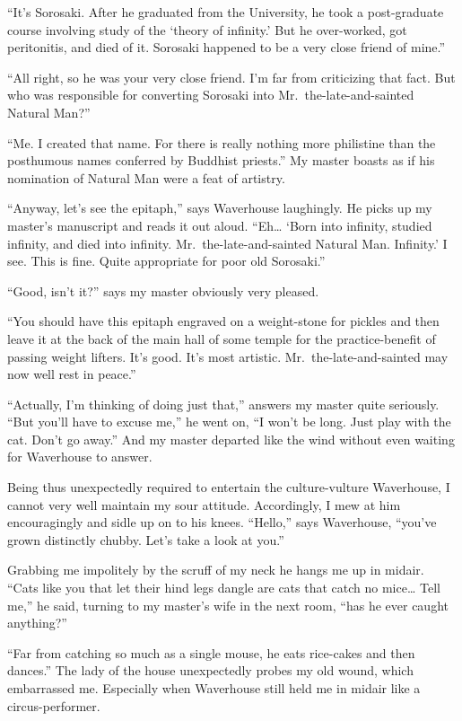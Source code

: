 \documentclass{book}
\begin{document}
``It's Sorosaki. After he graduated from the University, he took a
post-graduate course involving study of the `theory of infinity.' But he
over-worked, got peritonitis, and died of it. Sorosaki happened to be a
very close friend of mine.''

``All right, so he was your very close friend. I'm far from criticizing
that fact. But who was responsible for converting Sorosaki into
Mr.~the-late-and-sainted Natural Man?''

``Me. I created that name. For there is really nothing more philistine
than the posthumous names conferred by Buddhist priests.'' My master
boasts as if his nomination of Natural Man were a feat of artistry.

``Anyway, let's see the epitaph,'' says Waverhouse laughingly. He picks
up my master's manuscript and reads it out aloud. ``Eh\ldots{} `Born
into infinity, studied infinity, and died into infinity.
Mr.~the-late-and-sainted Natural Man. Infinity.' I see. This is fine.
Quite appropriate for poor old Sorosaki.''

``Good, isn't it?'' says my master obviously very pleased.

``You should have this epitaph engraved on a weight-stone for pickles
and then leave it at the back of the main hall of some temple for the
practice-benefit of passing weight lifters. It's good. It's most
artistic. Mr.~the-late-and-sainted may now well rest in peace.''

``Actually, I'm thinking of doing just that,'' answers my master quite
seriously. ``But you'll have to excuse me,'' he went on, ``I won't be
long. Just play with the cat. Don't go away.'' And my master departed
like the wind without even waiting for Waverhouse to answer.

Being thus unexpectedly required to entertain the culture-vulture
Waverhouse, I cannot very well maintain my sour attitude. Accordingly, I
mew at him encouragingly and sidle up on to his knees. ``Hello,'' says
Waverhouse, ``you've grown distinctly chubby. Let's take a look at
you.''

Grabbing me impolitely by the scruff of my neck he hangs me up in
midair. ``Cats like you that let their hind legs dangle are cats that
catch no mice\ldots{} Tell me,'' he said, turning to my master's wife in
the next room, ``has he ever caught anything?''

``Far from catching so much as a single mouse, he eats rice-cakes and
then dances.'' The lady of the house unexpectedly probes my old wound,
which embarrassed me. Especially when Waverhouse still held me in midair
like a circus-performer.
\end{document}
